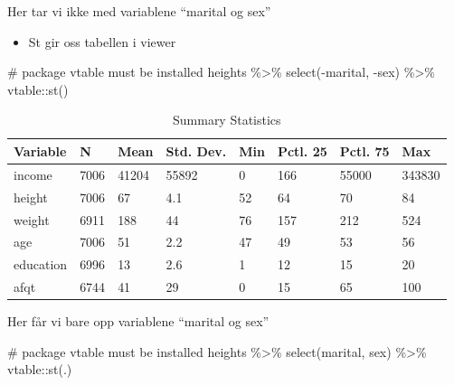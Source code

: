 \documentclass[
  letterpaper,
  DIV=11,
  numbers=noendperiod]{scrartcl}
\newenvironment{Shaded}{\begin{snugshade}}{\end{snugshade}}
\newcommand{\CommentTok}[1]{\textcolor[rgb]{0.37,0.37,0.37}{#1}}
\newcommand{\FunctionTok}[1]{\textcolor[rgb]{0.28,0.35,0.67}{#1}}
\newcommand{\NormalTok}[1]{\textcolor[rgb]{0.00,0.23,0.31}{#1}}
\newcommand{\SpecialCharTok}[1]{\textcolor[rgb]{0.37,0.37,0.37}{#1}}
\providecommand{\tightlist}{%
  \setlength{\itemsep}{0pt}\setlength{\parskip}{0pt}}\usepackage{longtable,booktabs,array}
\begin{document}
Her tar vi ikke med variablene ``marital og sex''

\begin{itemize}
\tightlist
\item
  St gir oss tabellen i viewer
\end{itemize}

\begin{Shaded}
\begin{Highlighting}[]
\CommentTok{\# package vtable must be installed}
\NormalTok{heights }\SpecialCharTok{\%\textgreater{}\%} 
  \FunctionTok{select}\NormalTok{(}\SpecialCharTok{{-}}\NormalTok{marital, }\SpecialCharTok{{-}}\NormalTok{sex) }\SpecialCharTok{\%\textgreater{}\%} 
\NormalTok{  vtable}\SpecialCharTok{::}\FunctionTok{st}\NormalTok{()}
\end{Highlighting}
\end{Shaded}

\begin{table}

\caption{Summary Statistics}
\centering
\begin{tabular}[t]{llllllll}
\toprule
Variable & N & Mean & Std. Dev. & Min & Pctl. 25 & Pctl. 75 & Max\\
\midrule
income & 7006 & 41204 & 55892 & 0 & 166 & 55000 & 343830\\
height & 7006 & 67 & 4.1 & 52 & 64 & 70 & 84\\
weight & 6911 & 188 & 44 & 76 & 157 & 212 & 524\\
age & 7006 & 51 & 2.2 & 47 & 49 & 53 & 56\\
education & 6996 & 13 & 2.6 & 1 & 12 & 15 & 20\\
\addlinespace
afqt & 6744 & 41 & 29 & 0 & 15 & 65 & 100\\
\bottomrule
\end{tabular}
\end{table}

Her får vi bare opp variablene ``marital og sex''

\begin{Shaded}
\begin{Highlighting}[]
\CommentTok{\# package vtable must be installed}
\NormalTok{heights }\SpecialCharTok{\%\textgreater{}\%} 
  \FunctionTok{select}\NormalTok{(marital, sex) }\SpecialCharTok{\%\textgreater{}\%} 
\NormalTok{  vtable}\SpecialCharTok{::}\FunctionTok{st}\NormalTok{(.)}
\end{Highlighting}
\end{Shaded}
\end{document}
